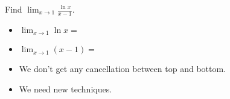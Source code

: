 \begin{frame}
\begin{example}[Example 1, p. 472]
Find $\lim_{x\rightarrow 1}\frac{\ln x}{x - 1}$.
\begin{itemize}
\item<2-| alert@3-4>  $\lim_{x\rightarrow 1} \ln x = $ 
\item<2-| alert@5-6>  $\lim_{x\rightarrow 1} (x - 1) = $ 
\item<7->  We don't get any cancellation between top and bottom.
\item<8->  We need new techniques.
\end{itemize}
\end{example}
\end{frame}
